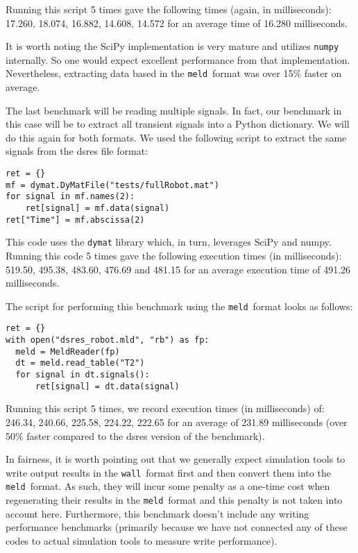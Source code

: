 \documentclass[11pt,a4paper,twocolumn]{article}
\newcommand{\wall}{\texttt{wall}}
\newcommand{\meld}{\texttt{meld}}
\newcommand{\code}[1]{\texttt{#1}} %
\begin{document}
Running this script 5 times gave the following times (again, in
milliseconds): 17.260, 18.074, 16.882, 14.608, 14.572 for an average
time of 16.280 milliseconds.

It is worth noting the SciPy implementation is very mature and
utilizes \code{numpy} internally.  So one would expect excellent
performance from that implementation.  Nevertheless, extracting data
based in the \meld\ format was over 15\% faster on average.


The last benchmark will be reading multiple signals.  In fact, our
benchmark in this case will be to extract all transient signals into a
Python dictionary.  We will do this again for both formats.  We used
the following script to extract the same signals from the dsres file
format:

\begin{verbatim}
ret = {}
mf = dymat.DyMatFile("tests/fullRobot.mat")
for signal in mf.names(2):
    ret[signal] = mf.data(signal)
ret["Time"] = mf.abscissa(2)
\end{verbatim}

This code uses the \code{dymat} library which, in turn, leverages
SciPy and numpy.  Running this code 5 times gave the following
execution times (in milliseconds): 519.50, 495.38, 483.60, 476.69 and
481.15 for an average execution time of 491.26 milliseconds.

The script for performing this benchmark using the \meld\ format looks
as follows:

\begin{verbatim}
ret = {}
with open("dsres_robot.mld", "rb") as fp:
  meld = MeldReader(fp)
  dt = meld.read_table("T2")
  for signal in dt.signals():
      ret[signal] = dt.data(signal)
\end{verbatim}

Running this script 5 times, we record execution times (in
milliseconds) of: 246.34, 240.66, 225.58, 224.22, 222.65 for an
average of 231.89 milliseconds (over 50\% faster compared to the dsres
version of the benchmark).

In fairness, it is worth pointing out that we generally expect
simulation tools to write output results in the \wall\ format first
and then convert them into the \meld\ format.  As such, they will
incur some penalty as a one-time cost when regenerating their results
in the \meld\ format and this penalty is not taken into account here.
Furthermore, this benchmark doesn't include any writing performance
benchmarks (primarily because we have not connected any of these codes
to actual simulation tools to measure write performance).
\end{document}
